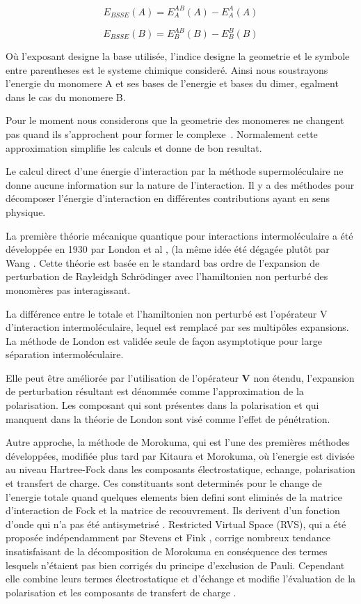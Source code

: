 \begin{equation}
E_{BSSE}(A) = E_{A}^{AB}(A) - E_{A}^{A}(A)
\end{equation}

\begin{equation}
E_{BSSE}(B) = E_{B}^{AB}(B) - E_{B}^{B}(B)
\end{equation}

Où l'exposant designe la base utilisée, l'indice designe la geometrie et le symbole entre parentheses est le systeme chimique consideré. Ainsi nous soustrayons l'energie du monomere A et ses bases de l'energie et bases du dimer, egalment dans le cas du monomere B. 

Pour le moment nous considerons que la geometrie des monomeres ne changent pas quand ils s'approchent pour former le complexe . Normalement cette approximation simplifie les calculs et donne de bon resultat. 

Le calcul direct d’une énergie d’interaction par la méthode supermoléculaire ne donne aucune information sur la nature de l’interaction. Il y a des méthodes pour décomposer l’énergie d’interaction en différentes contributions ayant en sens physique. 

La première théorie mécanique quantique pour interactions intermoléculaire a été développée en 1930 par London et al \cite{london1930z}, (la même idée été dégagée plutôt par Wang \cite{wang1927mutual}. Cette théorie est basée en le standard bas ordre de l’expansion  de perturbation de Rayleidgh Schrödinger avec l’hamiltonien non perturbé des monomères pas interagissant. 

La différence entre le totale et l’hamiltonien non perturbé est l’opérateur V d’interaction intermoléculaire, lequel est remplacé par ses multipôles expansions. La méthode de London est validée seule de façon asymptotique pour large séparation intermoléculaire.

Elle peut être améliorée par l’utilisation de l’opérateur \textbf{V} non étendu, l’expansion de perturbation résultant est  dénommée comme l’approximation de la polarisation. Les composant qui sont présentes dans la polarisation et qui manquent dans la théorie de London sont visé comme l’effet de pénétration.  

Autre approche, la méthode de Morokuma, qui est l’une des premières méthodes développées, modifiée plus tard par Kitaura et Morokuma, où l'energie est divisée au niveau Hartree-Fock dans les composants  électrostatique, echange, polarisation et transfert de charge. Ces constituants sont determinés pour le change de l'energie totale quand quelques elements bien defini sont eliminés de la matrice d'interaction de Fock et la matrice de recouvrement. Ils derivent d'un fonction d'onde  qui n'a pas été antisymetrisé \cite{morokuma1977molecules}. Restricted Virtual Space (RVS), qui a été proposée indépendamment par Stevens et Fink \cite{stevens1987frozen}, corrige nombreux tendance insatisfaisant de la décomposition de Morokuma en conséquence des termes lesquels n’étaient pas bien corrigés du principe d’exclusion de Pauli. Cependant elle combine leurs termes électrostatique et d’échange et modifie l’évaluation de la polarisation et les composants de transfert de charge \cite{chen1996energy}.


